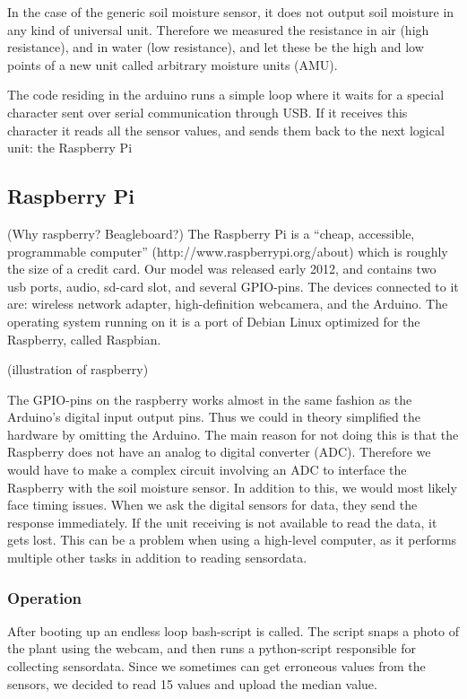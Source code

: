 In the case of the generic soil moisture sensor, it does not output soil moisture in any kind of universal unit. Therefore we measured the resistance in air (high resistance), and in water (low resistance), and let these be the high and low points of a new unit called arbitrary moisture units (AMU).

The code residing in the arduino runs a simple loop where it waits for a special character sent over serial communication through USB. If it receives this character it reads all the sensor values, and sends them back to the next logical unit: the Raspberry Pi

\subsection{Raspberry Pi}
(Why raspberry? Beagleboard?)
The Raspberry Pi is a “cheap, accessible, programmable computer” (http://www.raspberrypi.org/about) which is roughly the size of a credit card. Our model was released early 2012, and contains two usb ports, audio, sd-card slot, and several GPIO-pins. The devices connected to it are: wireless network adapter, high-definition webcamera, and the Arduino. The operating system running on it is a port of Debian Linux optimized for the Raspberry, called Raspbian. 

(illustration of raspberry)

The GPIO-pins on the raspberry works almost in the same fashion as the Arduino’s digital input output pins. Thus we could in theory simplified the hardware by omitting the Arduino. The main reason for not doing this is that the Raspberry does not have an analog to digital converter (ADC). Therefore we would have to make a complex circuit involving an ADC to interface the Raspberry with the soil moisture sensor. In addition to this, we would most likely face timing issues. When we ask the digital sensors for data, they send the response immediately. If the unit receiving is not available to read the data, it gets lost. This can be a problem when using a high-level computer, as it performs multiple other tasks in addition to reading sensordata. 

\subsubsection{Operation}
After booting up an endless loop bash-script is called. The script snaps a photo of the plant using the webcam, and then runs a python-script responsible for collecting sensordata. Since we sometimes can get erroneous values from the sensors, we decided to read 15 values and upload the median value.


